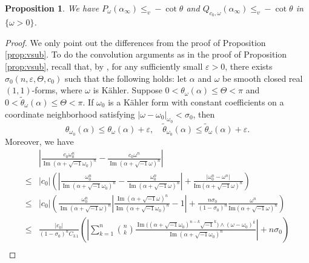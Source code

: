 \documentclass[10pt,a4paper]{amsart}
\numberwithin{equation}{section}
\newtheorem{prop}[equation]{Proposition}
\begin{document}
\begin{prop}\label{prop:vsubdHYM}
    We have $P_\omega(\alpha_\infty)\le_v -\cot\theta$ and $Q_{c_0,\omega}(\alpha_\infty)\le_v -\cot\theta$ in $\{\omega>0\}$.
\end{prop}

\begin{proof}
    We only point out the differences from the proof of Proposition \ref{prop:vsub}. To do the convolution arguments as in the proof of Proposition \ref{prop:vsub}, recall that, by \cite[Lemma 5.1]{CL}, for any sufficiently small $\varepsilon>0$, there exists $\sigma_0(n,\varepsilon,\Theta,c_0)$ such that the following holds: let $\alpha$ and $\omega$ be smooth closed real $(1,1)$-forms, where $\omega$ is Kähler. Suppose $0<\theta_\omega(\alpha)\le\Theta<\pi$ and $0<\tilde{\theta}_\omega(\alpha)\le\Theta<\pi$.
    If $\omega_0$ is a Kähler form with constant coefficients on a coordinate neighborhood satisfying $\vert\omega-\omega_0\vert_{\omega_0}<\sigma_0$, then
    \begin{equation}\label{eq:CL}
        \theta_{\omega_0}(\alpha)\le \theta_\omega(\alpha)+\varepsilon,\quad \tilde{\theta}_{\omega_0}(\alpha)\le \tilde{\theta}_\omega(\alpha)+\varepsilon.
    \end{equation}
    Moreover, we have
    \begin{equation}\label{eq:c_0term}
        \begin{aligned}
        &\left\vert\frac{c_0\omega_0^n}{\operatorname{Im}(\alpha+\sqrt{-1}\omega_0)^n}-\frac{c_0\omega^n}{\operatorname{Im}(\alpha+\sqrt{-1}\omega)^n}\right\vert\\
        \le&\vert c_0\vert \left(\left\vert\frac{\omega_0^n}{\operatorname{Im}(\alpha+\sqrt{-1}\omega_0)^n}-\frac{\omega_0^n}{\operatorname{Im}(\alpha+\sqrt{-1}\omega)^n}\right\vert+\frac{\vert\omega_0^n-\omega^n\vert}{\mathrm{Im}(\alpha+\sqrt{-1}\omega)^n}\right)\\
        \le&\vert c_0\vert \left(\frac{\omega_0^n}{\operatorname{Im}(\alpha+\sqrt{-1}\omega)^n}\left\vert\frac{\operatorname{Im}(\alpha+\sqrt{-1}\omega)^n}{\operatorname{Im}(\alpha+\sqrt{-1}\omega_0)^n}-1\right\vert+\frac{n\sigma_0}{(1-\sigma_0)^n}\frac{\omega^n}{\mathrm{Im}(\alpha+\sqrt{-1}\omega)^n}\right)\\
        \le&\frac{\vert c_0\vert}{(1-\sigma_0)^n C_{3.1}}\left(\left\vert\sum_{k=1}^n{n\choose k}\frac{\operatorname{Im}\big((\alpha+\sqrt{-1}\omega_0)^{n-k}\sqrt{-1}^k\big)\wedge(\omega-\omega_0)^k}{\operatorname{Im}(\alpha+\sqrt{-1}\omega_0)^n}\right\vert+n\sigma_0\right)\\

\end{aligned}
\end{equation}
\end{proof}
\end{document}

